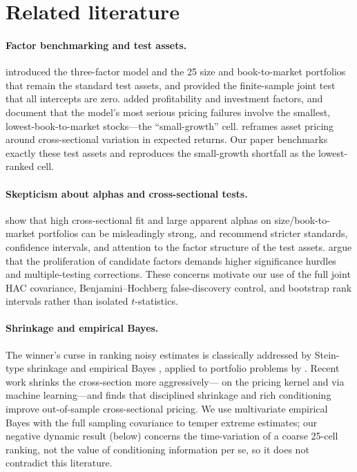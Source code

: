 \documentclass[11pt]{article}
\begin{document}
\section{Related literature}\label{sec:lit}
\paragraph{Factor benchmarking and test assets.}
\citet{FamaFrench1993} introduced the three-factor model and the 25 size and
book-to-market portfolios that remain the standard test assets, and
\citet{GRS1989} provided the finite-sample joint test that all intercepts are
zero. \citet{FamaFrench2015} added profitability and investment factors, and
\citet{FamaFrench2016} document that the model's most serious pricing failures
involve the smallest, lowest-book-to-market stocks---the ``small-growth''
cell. \citet{Cochrane2011} reframes asset pricing around cross-sectional
variation in expected returns. Our paper benchmarks exactly these test assets
and reproduces the small-growth shortfall as the lowest-ranked cell.

\paragraph{Skepticism about alphas and cross-sectional tests.}
\citet{LewellenNagelShanken2010} show that high cross-sectional fit and large
apparent alphas on size/book-to-market portfolios can be misleadingly strong,
and recommend stricter standards, confidence intervals, and attention to the
factor structure of the test assets. \citet{HarveyLiuZhu2016} argue that the
proliferation of candidate factors demands higher significance hurdles and
multiple-testing corrections. These concerns motivate our use of the full
joint HAC covariance, Benjamini--Hochberg false-discovery control, and
bootstrap rank intervals rather than isolated $t$-statistics.

\paragraph{Shrinkage and empirical Bayes.}
The winner's curse in ranking noisy estimates is classically addressed by
Stein-type shrinkage and empirical Bayes \citep{EfronMorris1973}, applied to
portfolio problems by \citet{Jorion1986}. Recent work shrinks the
cross-section more aggressively---\citet{KozakNagelSantosh2020} on the pricing
kernel and \citet{GuKellyXiu2020} via machine learning---and finds that
disciplined shrinkage and rich conditioning improve out-of-sample
cross-sectional pricing. We use multivariate empirical Bayes with the full
sampling covariance to temper extreme estimates; our negative dynamic result
(below) concerns the time-variation of a coarse 25-cell ranking, not the value
of conditioning information per se, so it does not contradict this literature.
\end{document}
